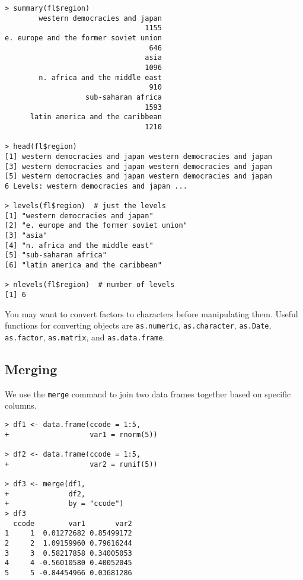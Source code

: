 \begin{lstlisting}
> summary(fl$region)
        western democracies and japan 
                                 1155 
e. europe and the former soviet union 
                                  646 
                                 asia 
                                 1096 
        n. africa and the middle east 
                                  910 
                   sub-saharan africa 
                                 1593 
      latin america and the caribbean 
                                 1210 
                                 
> head(fl$region) 
[1] western democracies and japan western democracies and japan
[3] western democracies and japan western democracies and japan
[5] western democracies and japan western democracies and japan
6 Levels: western democracies and japan ...

> levels(fl$region)  # just the levels
[1] "western democracies and japan"        
[2] "e. europe and the former soviet union"
[3] "asia"                                 
[4] "n. africa and the middle east"        
[5] "sub-saharan africa"                   
[6] "latin america and the caribbean"      
 
> nlevels(fl$region)  # number of levels
[1] 6                                 
\end{lstlisting}

You may want to convert factors to characters before manipulating them. Useful functions for converting objects are \texttt{as.numeric}, \texttt{as.character}, \texttt{as.Date}, \texttt{as.factor}, \texttt{as.matrix}, and \texttt{as.data.frame}.

\subsection{Merging}

We use the \texttt{merge} command to join two data frames together based on specific columns.

\begin{lstlisting}
> df1 <- data.frame(ccode = 1:5,
+                   var1 = rnorm(5))

> df2 <- data.frame(ccode = 1:5,
+                   var2 = runif(5))

> df3 <- merge(df1,
+              df2,
+              by = "ccode")
> df3
  ccode        var1       var2
1     1  0.01272682 0.85499172
2     2  1.09159960 0.79616244
3     3  0.58217858 0.34005053
4     4 -0.56010580 0.40052045
5     5 -0.84454966 0.03681286
\end{lstlisting}

